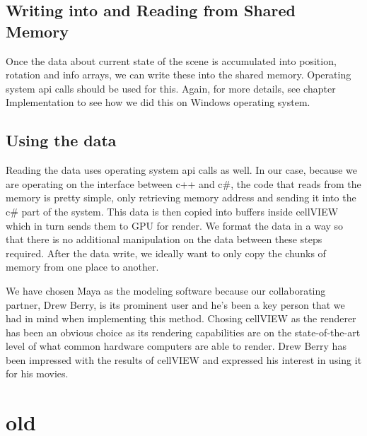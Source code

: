 \documentclass[
  digital, %
  table,   %
  nolof,     %
  nolot,     %
]{fithesis3}
\begin{document}
\subsection{Writing into and Reading from Shared Memory}
Once the data about current state of the scene is accumulated into position, rotation and info arrays, we can write these into the shared memory. Operating system api calls should be used for this. Again, for more details, see chapter Implementation to see how we did this on Windows operating system.

\subsection{Using the data}
Reading the data uses operating system api calls as well. In our case, because we are operating on the interface between c++ and c\#, the code that reads from the memory is pretty simple, only retrieving memory address and sending it into the c\# part of the system. This data is then copied into buffers inside cellVIEW which in turn sends them to GPU for render. We format the data in a way so that there is no additional manipulation on the data between these steps required. After the data write, we ideally want to only copy the chunks of memory from one place to another.

We have chosen Maya as the modeling software because our collaborating partner, Drew Berry, is its prominent user and he's been a key person that we had in mind when implementing this method. Chosing cellVIEW as the renderer has been an obvious choice as its rendering capabilities are on the state-of-the-art level of what common hardware computers are able to render. Drew Berry has been impressed with the results of cellVIEW and expressed his interest in using it for his movies.

\section{old}
\end{document}
